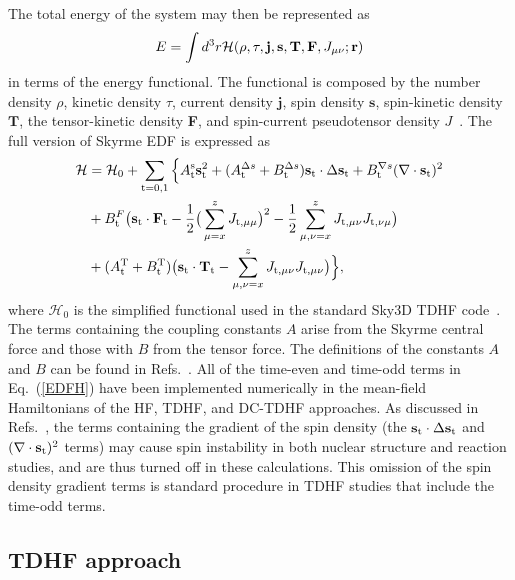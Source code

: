 \documentclass[aps,prc,twocolumn,showpacs,superscriptaddress,longbibliography,floatfix,10pt]{revtex4-1}
\begin{document}
The total energy of the system may then be represented as
\begin{equation}
E=\int d^3r  {\cal H}(\rho, \tau, {\mathbf{j}}, {\textbf{s}}, {\textbf{T}}, {\textbf{F}}, J_{\mu\nu}; {\mathbf{r}})
\label{Energy}
\end{equation}
in terms of the energy functional. The functional is composed by
the number density $\rho$, kinetic density $\tau$, current density ${\mathbf{j}}$, spin density ${\mathbf{s}}$, spin-kinetic density ${\mathbf{T}}$,
the tensor-kinetic density {\textbf{F}}, and spin-current pseudotensor density $J$~\cite{stevenson2016}. The full version of Skyrme EDF is expressed as
\begin{align}
\label{EDFH}
\begin{split}
\mathcal{H}&=\mathcal{H}_0+\sum_{\rm{t=0,1}}\Big\{A_{\rm{t}}^{\rm{s}}\mathbf{s}_{\rm{t}}^2+(A_{\rm{t}}^{\Delta{s}}+B_{\rm{t}}^{\Delta{s}})
\mathbf{s}_{\rm{t}}\cdot\Delta\mathbf{s}_{\rm{t}}+B_{\rm{t}}^{\nabla s}(\nabla\cdot \mathbf{s}_{\rm{t}})^2 \\
&+B_{\rm{t}}^{F}\big(\mathbf{s}_{\rm{t}}\cdot
\mathbf {F}_{\rm{t}}-\frac{1}{2}\big(\sum_{\mu=x}^{z}J_{\rm{t}, \mu\mu}\big)^2-\frac{1}{2}\sum_{\mu, \nu=x}^{z}J_{\rm{t}, \mu\nu}J_{\rm{t}, \nu \mu}\big)\\
&+(A_{\rm{t}}^{\rm{T}}+B_{\rm{t}}^{\rm{T}})\big(\mathbf{s}_{\rm{t}}\cdot\mathbf{T}_{\rm{t}}-
\sum_{\mu,\nu=x}^{z}J_{\rm{t},\mu\nu}J_{\rm{t},\mu\nu}\big)\Big\},
\end{split}
\end{align}
where $\mathcal{H}_0$ is the simplified functional used in the standard Sky3D TDHF code~\cite{maruhn2014}.
The terms containing the coupling constants $A$ arise from the Skyrme central force and those with $B$ from the tensor force. The definitions of the constants $A$ and $B$
can be found in Refs.~\cite{lesinski2007,davesne2009}. All of the time-even and time-odd terms in Eq.~(\ref{EDFH}) have been implemented numerically in the mean-field Hamiltonians of the HF, TDHF, and DC-TDHF approaches.
As discussed in Refs.~\cite{lesinski2007,stevenson2016}, the terms containing the gradient of the spin density (the $\mathbf{s}_{\rm{t}}\cdot\Delta\mathbf{s}_{\rm{t}}$ and $(\nabla\cdot \mathbf{s}_{\rm{t}})^2$ terms) may cause spin instability in both nuclear structure and reaction studies, and are thus turned off in these calculations.
This omission of the spin density gradient terms is standard procedure in TDHF studies that include the time-odd terms.


\subsection{TDHF approach}
\end{document}
